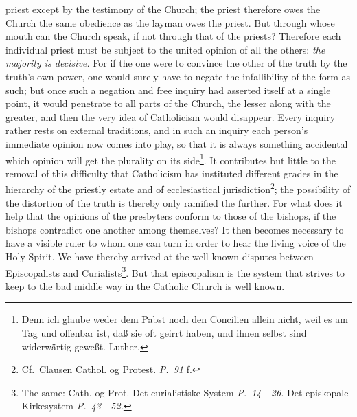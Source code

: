 \documentclass[12pt]{book}
\newcommand{\opage}[1]{\marginnote{\footnotesize\textit{[#1]}}}
\begin{document}
priest except by the testimony of the Church; the priest therefore owes the
Church the same obedience as the layman owes the priest. But through whose
mouth can the Church speak, if not through that of the priests? Therefore each
individual priest must be subject to the united opinion of all the others:
\emph{the majority is decisive.} For if the one were to convince the other of
the truth by the truth's own power, one would surely have to negate the
infallibility of the form as such; but once such a negation and free inquiry
had asserted itself at a single point, it would penetrate to all parts of the
Church, the lesser along with the greater, and then the very idea of
Catholicism would disappear. Every inquiry rather rests on external traditions,
and in such an inquiry each person's immediate opinion now comes into play, so
that it is always something accidental which opinion will get the plurality on
its side\footnote{Denn ich glaube weder dem Pabst noch den Concilien allein
nicht, weil es am Tag und offenbar ist, daß sie oft geirrt haben, und ihnen
selbst sind widerwärtig geweßt. Luther.}. It contributes but little to the
removal of this difficulty that Catholicism has instituted different grades in
the hierarchy of the priestly estate and of ecclesiastical
jurisdiction\footnote{Cf.\ Clausen Cathol. og Protest. \textit{P.\ 91} f.}; the
possibility of the
\opage{59}\setcounter{footnote}{0}%
distortion of the truth is thereby only ramified the further. For what does it
help that the opinions of the presbyters conform to those of the bishops, if
the bishops contradict one another among themselves? It then becomes necessary
to have a visible ruler to whom one can turn in order to hear the living voice
of the Holy Spirit. We have thereby arrived at the well-known disputes between
Episcopalists and Curialists\footnote{The same: Cath. og Prot. Det
curialistiske System \textit{P.\ 14---26.} Det episkopale Kirkesystem \textit{P.\
43---52.}}. But that episcopalism is the system that strives to keep to the bad
middle way in the Catholic Church is well known.
\end{document}
